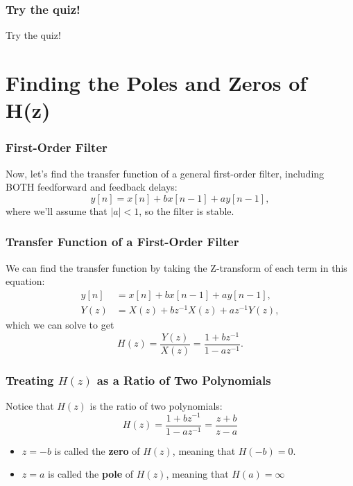 \documentclass{beamer}
\begin{document}
\begin{frame}
  \frametitle{Try the quiz!}

  Try the quiz!
\end{frame}

\section[Poles and Zeros]{Finding the Poles and Zeros of H(z)}
\setcounter{subsection}{1}

\begin{frame}
  \frametitle{First-Order Filter}

  Now, let's find the transfer function of a general first-order filter, including BOTH
  feedforward and feedback delays:
  \[
  y[n] = x[n] + bx[n-1] + ay[n-1],
  \]
  where we'll assume that $|a|<1$, so the filter is stable.  
\end{frame}

\begin{frame}
  \frametitle{Transfer Function of a First-Order Filter}

  We can find the transfer function by taking the Z-transform of each
  term in this equation:
  \begin{align*}
    y[n] &= x[n] + bx[n-1] + ay[n-1],\\
    Y(z) &= X(z)+bz^{-1}X(z)+az^{-1} Y(z),
  \end{align*}
  which we can solve to get
  \[
  H(z)  = \frac{Y(z)}{X(z)} = \frac{1+bz^{-1}}{1-az^{-1}}.
  \]
\end{frame}

\begin{frame}
  \frametitle{Treating $H(z)$ as a Ratio of Two Polynomials}

  Notice that $H(z)$ is the ratio of two polynomials:
  \[
  H(z)=\frac{1+bz^{-1}}{1-az^{-1}}=\frac{z+b}{z-a}
  \]
  \begin{itemize}
  \item $z=-b$ is called the {\bf zero} of $H(z)$, meaning that $H(-b)=0$.
  \item $z=a$ is called the {\bf pole} of $H(z)$, meaning that $H(a)=\infty$
  \end{itemize}
\end{frame}
\end{document}
